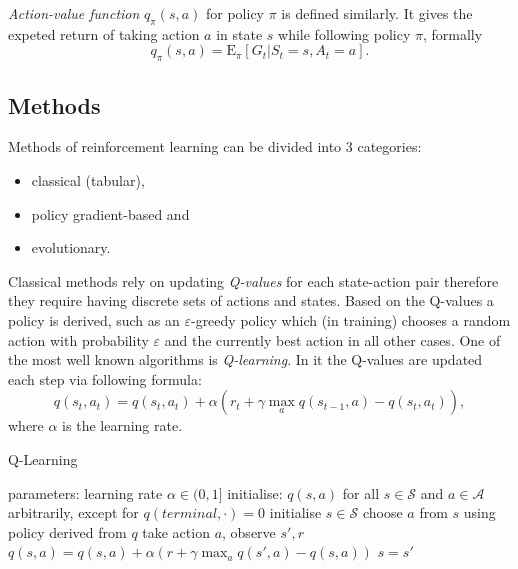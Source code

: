 \emph{Action-value function} $q_\pi(s,a)$ for policy $\pi$ is defined similarly. It gives the expeted return of taking action $a$ in state $s$ while following policy $\pi$, formally
\begin{equation}
    q_\pi(s,a) = \mathrm{E}_\pi[G_t|S_t=s, A_t=a].
\end{equation}\cite{Sutton1998}
\subsection{Methods}
Methods of reinforcement learning can be divided into 3 categories: \begin{itemize}
    \item classical (tabular),
    \item policy gradient-based and
    \item evolutionary.
\end{itemize}

Classical methods rely on updating \emph{Q-values} for each state-action pair therefore they require having discrete sets of actions and states. Based on the Q-values a policy is derived, such as an $\varepsilon$-greedy policy which (in training) chooses a random action with probability $\varepsilon$ and the currently best action in all other cases. One of the most well known algorithms is \emph{Q-learning}. In it the Q-values are updated each step via following formula:
\begin{equation}
    q(s_t,a_t) = q(s_t,a_t) + \alpha \left( r_t+\gamma \max_a q(s_{t-1},a)-q(s_t,a_t)\right), 
\end{equation}
where $\alpha$ is the learning rate.

\begin{algorithm}
    \begin{algorithmic}[1]
    \caption{Q-Learning}
    \label{alg:q-learning}
        \State parameters: learning rate $\alpha \in (0,1]$ 
        \State initialise: $q(s,a)$ for all $s\in\mathcal{S}$ and $a\in \mathcal{A}$ arbitrarily, except for $q(terminal, \cdot) = 0$ 
            \State initialise $s\in\mathcal{S}$
            \Repeat
                \State choose $a$ from $s$ using policy derived from $q$
                \State take action $a$, observe $s', r$
                \State $q(s,a) = q(s,a) + \alpha \left( r+\gamma \max_a q(s',a)-q(s,a)\right)$
                \State $s = s'$
        \EndFor
    \end{algorithmic}
\end{algorithm}

